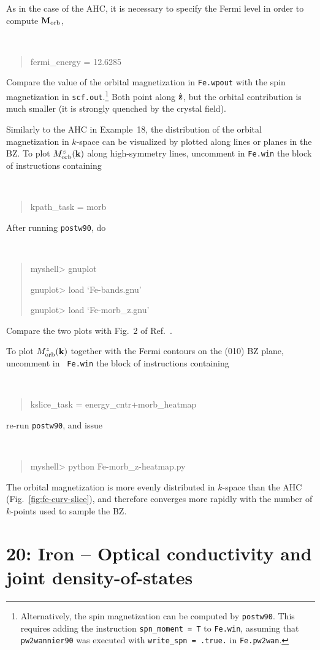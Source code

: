 \documentclass[a4paper,11pt,twoside]{article}
\begin{document}
As in the case of the AHC, it is necessary to specify the Fermi level
in order to compute ${\bf M}_{\rm orb}$,
%
{\tt
\begin{quote}
fermi\_energy = 12.6285
\end{quote}
} 
%
Compare the value of the orbital magnetization in {\tt Fe.wpout} with
the spin magnetization in {\tt scf.out}.\footnote{Alternatively, the
spin magnetization can be computed by {\tt postw90}. This requires adding the
instruction {\tt spn\_moment = T} to {\tt Fe.win}, assuming that {\tt pw2wannier90}
was executed with {\tt write\_spn = .true.} in {\tt Fe.pw2wan}.} 
Both point along $\hat{\bf
  z}$, but the orbital contribution is much smaller (it is strongly
quenched by the crystal field).

Similarly to the AHC in Example~18, the distribution of the orbital
magnetization in $k$-space can be visualized by plotted along lines or
planes in the BZ.  To plot $M^z_{\rm orb}({\bf k})$ along
high-symmetry lines, uncomment in {\tt Fe.win} the block of
instructions containing {\tt
\begin{quote}
kpath\_task = morb
\end{quote}
}
After running {\tt postw90}, do
{\tt
\begin{quote}
myshell> gnuplot

gnuplot> load `Fe-bands.gnu'

gnuplot> load `Fe-morb\_z.gnu'
\end{quote} }
Compare the two plots with Fig.~2 of Ref.~\cite{lopez-prb12}.


To plot $M^z_{\rm orb}({\bf k})$ together with the Fermi contours on the
(010) BZ plane, uncomment in {\tt
  Fe.win} the block of instructions containing 
{\tt
\begin{quote}
kslice\_task = energy\_cntr+morb\_heatmap
\end{quote}
} 
re-run {\tt postw90}, and issue
{\tt
\begin{quote}
myshell> python Fe-morb\_z-heatmap.py
\end{quote} } The orbital magnetization is more evenly distributed in
$k$-space than the AHC (Fig.~\ref{fig:fe-curv-slice}), and therefore
converges more rapidly with the number of $k$-points used to sample
the BZ.



\cleardoublepage

\section*{20: Iron -- Optical conductivity and joint density-of-states}
\end{document}
